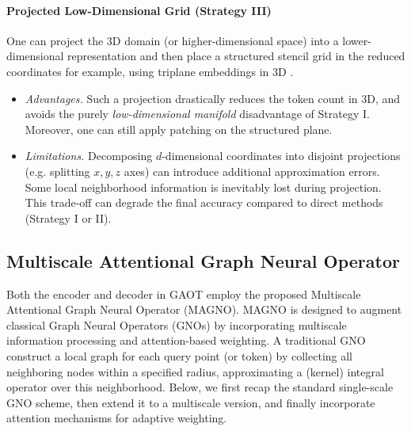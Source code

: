 \documentclass[reqno,10pt]{amsart}
\theoremstyle{plain}
\theoremstyle{definition}
\begin{document}
\paragraph{\bf Projected Low-Dimensional Grid (Strategy III)}
One can project the 3D domain (or higher-dimensional space) into a lower-dimensional representation and then place a structured stencil grid in the reduced coordinates \- for example, using triplane embeddings in 3D \cite{QC2025}.
\begin{itemize} \setlength{\itemsep}{0.8em}
    \item {\it Advantages.} Such a projection drastically reduces the token count in 3D, and avoids the purely {\it low-dimensional manifold} disadvantage of Strategy I. Moreover, one can still apply patching on the structured plane.
    \item {\it Limitations.} Decomposing $d$-dimensional coordinates into disjoint projections (e.g. splitting $x,y,z$ axes) can introduce additional approximation errors. Some local neighborhood information is inevitably lost during projection. This trade-off can degrade the final accuracy compared to direct methods (Strategy I or II).
\end{itemize}
\subsection{\bf Multiscale Attentional Graph Neural Operator}
Both the encoder and decoder in GAOT employ the proposed Multiscale Attentional Graph Neural Operator (MAGNO). MAGNO is designed to augment classical Graph Neural Operators (GNOs) by incorporating multiscale information processing and attention-based weighting. A traditional GNO construct a local graph for each query point (or token) by collecting all neighboring nodes within a specified radius, approximating a (kernel) integral operator over this neighborhood. Below, we first recap the standard single-scale GNO scheme, then extend it to a multiscale version, and finally incorporate attention mechanisms for adaptive weighting.
\end{document}

